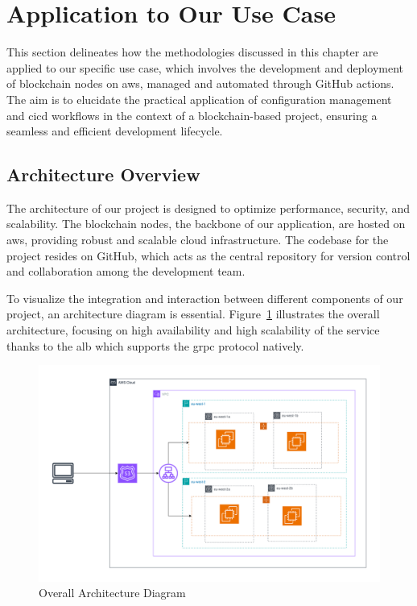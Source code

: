 \section{Application to Our Use Case}
\label{sec:application-use-case}

This section delineates how the methodologies discussed in this chapter are applied to our specific use case, which involves the development and deployment of blockchain nodes on \gls{aws}, managed and automated through GitHub actions. The aim is to elucidate the practical application of configuration management and \gls{cicd} workflows in the context of a blockchain-based project, ensuring a seamless and efficient development lifecycle.

\subsection{Architecture Overview}

The architecture of our project is designed to optimize performance, security, and scalability. The blockchain nodes, the backbone of our application, are hosted on \gls{aws}, providing robust and scalable cloud infrastructure. The codebase for the project resides on GitHub, which acts as the central repository for version control and collaboration among the development team.

To visualize the integration and interaction between different components of our project, an architecture diagram is essential. Figure~\ref{fig:architecture-diagram} illustrates the overall architecture, focusing on high availability and high scalability of the service thanks to the \gls{alb} which supports the \gls{grpc} protocol natively.

\begin{figure}[H]
    \centering
    \includegraphics[width=\textwidth]{figures/aws.png}
    \caption{Overall Architecture Diagram}
    \label{fig:architecture-diagram}
\end{figure}

